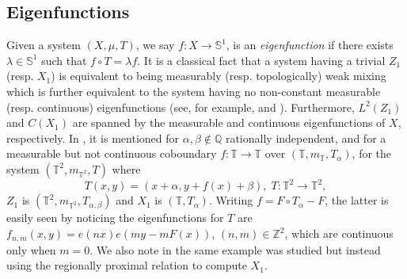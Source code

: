 \documentclass[12pt]{amsart}
\theoremstyle{definition}
\theoremstyle{plain}
\newtheorem{theorem}{Theorem}[section]
\newtheorem{corollary}[theorem]{Corollary}
\theoremstyle{definition}
\numberwithin{equation}{section}
\begin{document}






\subsection{Eigenfunctions}\label{eigenfunctions}

Given a system $(X,\mu,T)$, we say $f\colon X \rightarrow \mathbb{S}^{1}$, is an \textit{eigenfunction} if there exists $ \lambda \in \mathbb{S}^{1}$ such that $f\circ T=\lambda f$. It is a classical fact that a system having a trivial $Z_1$ (resp. $X_1$) is equivalent to being measurably (resp. topologically) weak mixing which is further equivalent to the system having no non-constant measurable (resp. continuous) eigenfunctions (see, for example, \cite{Shao and Ye} and \cite{Walters}). Furthermore, $L^2(Z_1)$ and $C(X_1)$ are spanned by the measurable and continuous eigenfunctions of $X$, respectively. In \cite{Parry}, it is mentioned for $\alpha,\beta \notin \mathbb{Q}$ rationally independent, and for a measurable but not continuous coboundary $f\colon \mathbb{T} \rightarrow \mathbb{T}$ over $(\mathbb{T},m_{\mathbb{T}},T_{\alpha})$, for the system $(\mathbb{T}^{2},m_{\mathbb{T}^{2}},T)$ where $$T(x,y)=(x+\alpha,y+f(x)+\beta),\; T\colon \mathbb{T}^{2} \rightarrow \mathbb{T}^{2},$$ $Z_1$ is $(\mathbb{T}^{2},m_{\mathbb{T}^{2}},T_{\alpha,\beta})$ and $X_1$ is $(\mathbb{T},T_{\alpha})$. Writing $f=F\circ T_{\alpha}-F$, the latter is easily seen by noticing the eigenfunctions for $T$ are $f_{n,m}(x,y)=e(nx)e(my-mF(x))$, $(n,m)\in \mathbb{Z}^{2}$, which are continuous only when $m=0$. We also note in \cite{Gla} the same example was studied but instead using the regionally proximal relation to compute $X_1$.
\end{document}
